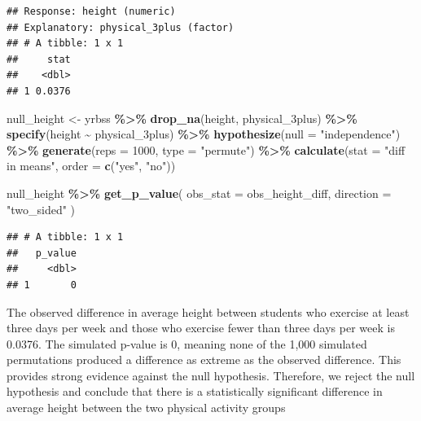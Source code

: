 \documentclass[
]{article}
\newenvironment{Shaded}{\begin{snugshade}}{\end{snugshade}}
\newcommand{\AttributeTok}[1]{\textcolor[rgb]{0.13,0.29,0.53}{#1}}
\newcommand{\DecValTok}[1]{\textcolor[rgb]{0.00,0.00,0.81}{#1}}
\newcommand{\FunctionTok}[1]{\textcolor[rgb]{0.13,0.29,0.53}{\textbf{#1}}}
\newcommand{\NormalTok}[1]{#1}
\newcommand{\OtherTok}[1]{\textcolor[rgb]{0.56,0.35,0.01}{#1}}
\newcommand{\SpecialCharTok}[1]{\textcolor[rgb]{0.81,0.36,0.00}{\textbf{#1}}}
\newcommand{\StringTok}[1]{\textcolor[rgb]{0.31,0.60,0.02}{#1}}
\begin{document}
\begin{verbatim}
## Response: height (numeric)
## Explanatory: physical_3plus (factor)
## # A tibble: 1 x 1
##     stat
##    <dbl>
## 1 0.0376
\end{verbatim}

\begin{Shaded}
\begin{Highlighting}[]
\NormalTok{null\_height }\OtherTok{\textless{}{-}}\NormalTok{ yrbss }\SpecialCharTok{\%\textgreater{}\%}
  \FunctionTok{drop\_na}\NormalTok{(height, physical\_3plus) }\SpecialCharTok{\%\textgreater{}\%}
  \FunctionTok{specify}\NormalTok{(height }\SpecialCharTok{\textasciitilde{}}\NormalTok{ physical\_3plus) }\SpecialCharTok{\%\textgreater{}\%}
  \FunctionTok{hypothesize}\NormalTok{(}\AttributeTok{null =} \StringTok{"independence"}\NormalTok{) }\SpecialCharTok{\%\textgreater{}\%}
  \FunctionTok{generate}\NormalTok{(}\AttributeTok{reps =} \DecValTok{1000}\NormalTok{, }\AttributeTok{type =} \StringTok{"permute"}\NormalTok{) }\SpecialCharTok{\%\textgreater{}\%}
  \FunctionTok{calculate}\NormalTok{(}\AttributeTok{stat =} \StringTok{"diff in means"}\NormalTok{, }\AttributeTok{order =} \FunctionTok{c}\NormalTok{(}\StringTok{"yes"}\NormalTok{, }\StringTok{"no"}\NormalTok{))}
\end{Highlighting}
\end{Shaded}

\begin{Shaded}
\begin{Highlighting}[]
\NormalTok{null\_height }\SpecialCharTok{\%\textgreater{}\%}
  \FunctionTok{get\_p\_value}\NormalTok{(}
    \AttributeTok{obs\_stat =}\NormalTok{ obs\_height\_diff,}
    \AttributeTok{direction =} \StringTok{"two\_sided"}
\NormalTok{  )}
\end{Highlighting}
\end{Shaded}

\begin{verbatim}
## # A tibble: 1 x 1
##   p_value
##     <dbl>
## 1       0
\end{verbatim}

The observed difference in average height between students who exercise
at least three days per week and those who exercise fewer than three
days per week is 0.0376. The simulated p-value is 0, meaning none of the
1,000 simulated permutations produced a difference as extreme as the
observed difference. This provides strong evidence against the null
hypothesis. Therefore, we reject the null hypothesis and conclude that
there is a statistically significant difference in average height
between the two physical activity groups
\end{document}
